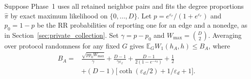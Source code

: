 \begin{lemma}\label{lem:pg-reference}
Suppose Phase~1 uses all retained neighbor pairs and fits the degree proportions $\widehat\pi$ by exact maximum likelihood on $\{0,\ldots,D\}$.
Let $p=e^{\varepsilon_r}/(1+e^{\varepsilon_r})$ and $p_0=1-p$ be the RR probabilities of reporting one for an edge and a nonedge, as in Section~\ref{sec:private_collection}. Set $\gamma=p-p_0$ and $W_{\max}=\binom D2$.
Averaging over protocol randomness for any fixed $G$ gives $\mathbb E_G W_1(h_A,h)\leq B_A$, where
\begin{equation}
\begin{aligned}
B_A={}&\frac{\sqrt{pp_0 W_{\max}}}{\gamma}
       +\frac{D-1}{\gamma\varepsilon_\ell}
       +\frac{D-1}{2(1-e^{-\varepsilon_d})}+\frac12\\
     &+(D-1)\bigl[\coth(\varepsilon_d/2)+1/\varepsilon_d+1\bigr].
\end{aligned}
\label{eq:pg-anchor-bound}
\end{equation}
\end{lemma}

